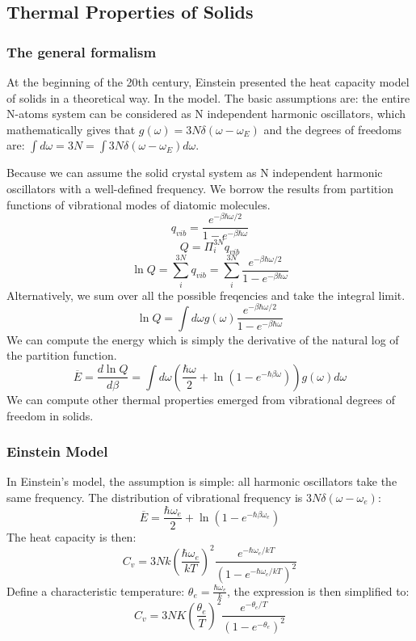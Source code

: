\documentclass[12pt, oneside]{article}   	%
\begin{document}
\subsection{Thermal Properties of Solids}
\subsubsection{The general formalism}
\par 
At the beginning of the 20th century, Einstein presented the heat capacity model of solids in a theoretical way. In the model. The basic assumptions are: the entire N-atoms system can be considered as N independent harmonic oscillators, which mathematically gives that $g(\omega) = 3N \delta(\omega - \omega_E)$ and the degrees of freedoms are: $\int d\omega = 3N = \int 3N \delta (\omega - \omega_E) d\omega$. 
\par
Because we can assume the solid crystal system as N independent harmonic oscillators with a well-defined frequency. We borrow the results from partition functions of vibrational modes of diatomic molecules. 
$$q_{vib} = \frac{e^{- \beta \hbar \omega /2}}{1- e^{- \beta \hbar \omega}} $$ 
$$Q = \Pi_i^{3N} q_{vib} $$
$$\ln Q = \sum_i^{3N} q_{vib} = \sum_i^{3N}  \frac{e^{- \beta \hbar \omega /2}}{1- e^{- \beta \hbar \omega}}  $$ 
Alternatively, we sum over all the possible freqencies and take the integral limit. 
$$\ln Q  = \int d\omega g(\omega)  \frac{e^{- \beta \hbar \omega /2}}{1- e^{- \beta \hbar \omega}} $$
We can compute the energy which is simply the derivative of the natural log of the partition function. 
$$\overline{E} = \frac{d \ln Q}{d \beta} = \int d \omega (\frac{\hbar \omega}{ 2}  + \ln (1 - e^{- \hbar \beta \omega})) g(\omega) d\omega$$
We can compute other thermal properties emerged from vibrational degrees of freedom in solids. 

\subsubsection*{Einstein Model}
In Einstein's model, the assumption is simple: all harmonic oscillators take the same frequency. The distribution of vibrational frequency is $3N \delta (\omega - \omega_e)$: 
$$\overline{E} = \frac{\hbar \omega_e}{ 2}  + \ln (1 - e^{- \hbar \beta \omega_e})$$
The heat capacity is then: 
$$C_v = 3 Nk (\frac{\hbar \omega_e}{k T})^2 \frac{e^{- \hbar \omega_e / kT }}{(1- e^{- \hbar \omega_e / kT })^2}$$
Define a characteristic temperature: $\theta_e = \frac{\hbar \omega_e}{k}$, the expression is then simplified to: 
$$C_v = 3 N K (\frac{\theta_e}{T})^2 \frac{ e^{- \theta_e / T} } {(1- e^{- \theta_e})^2}$$
\end{document}
